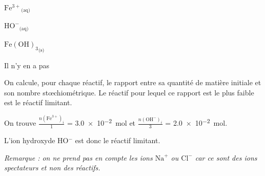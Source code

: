 
\debutEntrainement


\begin{enonce}
\begin{listeQCM4Colonnes}
	\item $\mathrm{Fe^{3+}}_\text{(aq)}$
	\item $\mathrm{HO^-}_\text{(aq)}$
	\item $\mathrm{Fe(OH)_3}_\text{(s)}$
	\item Il n'y en a pas
\end{listeQCM4Colonnes}
\bigskip
\end{enonce}

\reponse{\reponseB}
\begin{corrige}
On calcule, pour chaque réactif, le rapport entre sa quantité de matière initiale et son nombre stœchiométrique. Le réactif pour lequel ce rapport est le plus faible est le réactif limitant. 

On trouve
$\frac{n(\text{Fe}^{3+})_i}{1}$ = \SI{3,0e-2}{\mole} et $\frac{n(\text{OH}^-)_i}{3}$ = \SI{2,0e-2}{\mole}. 

L'ion hydroxyde HO$^-$ est donc le réactif limitant.

{\itshape Remarque : on ne prend pas en compte les ions $\mathrm{Na}^+$ ou $\mathrm{Cl}^-$ car ce sont des ions spectateurs et non des réactifs.}
\end{corrige}





